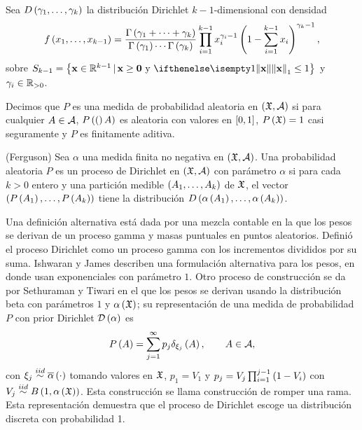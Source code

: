 \documentclass[runningheads,a4paper]{article}
\begin{document}
Sea $D\left( \gamma_{1}, \ldots, \gamma_{k} \right)$ la distribución Dirichlet $k-1$-dimensional con densidad
\[
f\Pp{x_{1},\ldots,x_{k-1}} = \frac{\Gamma\Pp{\gamma_{1} +\cdots+ \gamma_{k}}}{\Gamma\Pp{\gamma_{1}} \cdots \Gamma\Pp{\gamma_{k}}} %
                            \prod_{i = 1}^{k-1} x_{i}^{\gamma_{i} - 1} \Pp{1 - \sum_{i = 1}^{k-1} x_{i}}^{\gamma_{k} - 1},
\]
sobre $S_{k-1} = \Set{\mathbf{x} \in \R^{k-1} \,|\, \mathbf{x} \geq \mathbf{0} \text{ y } \norm[1]{\mathbf{x}} \leq 1}$  y %
$\gamma_{i} \in \mathbb{R}_{>0}$. 

Decimos que $P$ es una medida de probabilidad aleatoria en $\left( \mathfrak{X}, \mathcal{A} \right)$ si para cualquier $A \in \mathcal{A}$, $P\left( ( \right)A)$ es %
aleatoria con valores en $\left[ 0, 1 \right]$, $P\left( \mathfrak{X} \right) = 1$ casi seguramente y $P$ es finitamente aditiva.

\begin{defi}(Ferguson) 
Sea $\alpha$ una medida finita no negativa en $\left( \mathfrak{X}, \mathcal{A} \right)$. Una probabilidad aleatoria $P$ es un proceso de Dirichlet %
en $\left( \mathfrak{X}, \mathcal{A} \right)$ con parámetro $\alpha$ si para cada $k > 0$ entero y una partición medible $\left( A_{1}, \ldots, A_{k} \right)$ %
de $\mathfrak{X}$, el vector $\left( P\left( A_{1} \right), \ldots, P\left( A_{k} \right) \right)$ tiene la distribución $D\Pp{\alpha\Pp{A_{1}}, \ldots, \alpha %
\Pp{A_{k}}}$.
\end{defi}

Una definición alternativa está dada por una mezcla contable en la que los pesos se derivan de un proceso gamma y masas %
puntuales en puntos aleatorios. Definió el proceso Dirichlet como un proceso gamma con los incrementos divididos por su %
suma. Ishwaran y James describen una formulación alternativa para los pesos, en donde usan exponenciales con parámetro %
$1$. Otro proceso de construcción se da por Sethuraman y Tiwari en el que los pesos se derivan usando la distribución %
beta con parámetros $1$ y $\alpha\left( \mathfrak{X} \right)$; su representación de una medida de probabilidad $P$ con prior Dirichlet $\D%
\Pp{\alpha}$ es
\[
P\left( A \right) = \sum_{j = 1}^{\infty} p_{j} \delta_{\xi_{j}} \left( A \right), \qquad A \in \mathcal{A},
\]
con $\xi_{j} \stackrel{iid}{\sim} \overline{\alpha}\left( \cdot \right)$ tomando valores en $\mathfrak{X}$, $p_{1} = V_{1}$ y $p_{j} = V_{j} %
\prod_{i = 1}^{j-1} \Pp{1 - V_{i}}$ con $V_{j} \stackrel{iid}{\sim} B\left( 1, \alpha\left( \mathfrak{X} \right) \right)$. Esta construcción se llama %
construcción de romper una rama. Esta representación demuestra que el proceso de Dirichlet escoge ua distribución discreta %
con probabilidad 1.
\end{document}
